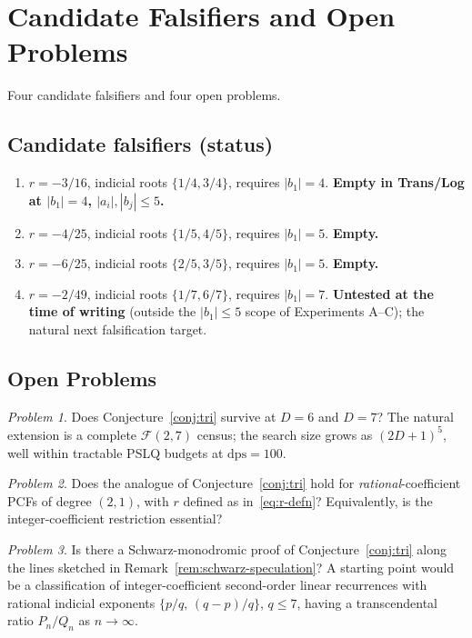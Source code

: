 \documentclass[11pt]{amsart}
\theoremstyle{definition}
\theoremstyle{remark}
\newtheorem{problem}{Problem}
\newcommand{\FF}{\mathcal{F}}
\newcommand{\dps}{\mathrm{dps}}
\begin{document}
\section{Candidate Falsifiers and Open Problems}\label{sec:open}

Four candidate falsifiers and four open problems.

\subsection*{Candidate falsifiers (status)}
\begin{enumerate}[label={\upshape(\arabic*)}]
\item $r = -3/16$, indicial roots $\{1/4, 3/4\}$, requires $|b_1| = 4$.
\textbf{Empty in Trans/Log at $|b_1| = 4$, $|a_i|, |b_j| \le 5$.}
\item $r = -4/25$, indicial roots $\{1/5, 4/5\}$, requires
$|b_1| = 5$. \textbf{Empty.}
\item $r = -6/25$, indicial roots $\{2/5, 3/5\}$, requires
$|b_1| = 5$. \textbf{Empty.}
\item $r = -2/49$, indicial roots $\{1/7, 6/7\}$, requires
$|b_1| = 7$.  \textbf{Untested at the time of writing} (outside the
$|b_1| \le 5$ scope of Experiments A--C); the natural next
falsification target.
\end{enumerate}

\subsection*{Open Problems}
\begin{problem}\label{prob:d6}
Does Conjecture~\ref{conj:tri} survive at $D = 6$ and $D = 7$?
The natural extension is a complete $\FF(2,7)$ census; the search
size grows as $(2D{+}1)^5$, well within tractable PSLQ budgets at
$\dps = 100$.
\end{problem}

\begin{problem}\label{prob:rational-coeffs}
Does the analogue of Conjecture~\ref{conj:tri} hold for
\emph{rational}-coefficient PCFs of degree $(2,1)$, with $r$ defined
as in~\eqref{eq:r-defn}?  Equivalently, is the integer-coefficient
restriction essential?
\end{problem}

\begin{problem}\label{prob:schwarz}
Is there a Schwarz-monodromic proof of Conjecture~\ref{conj:tri}
along the lines sketched in Remark~\ref{rem:schwarz-speculation}?
A starting point would be a classification of integer-coefficient
second-order linear recurrences with rational indicial exponents
$\{p/q,\,(q-p)/q\}$, $q \le 7$, having a transcendental ratio
$P_n/Q_n$ as $n \to \infty$.
\end{problem}
\end{document}
